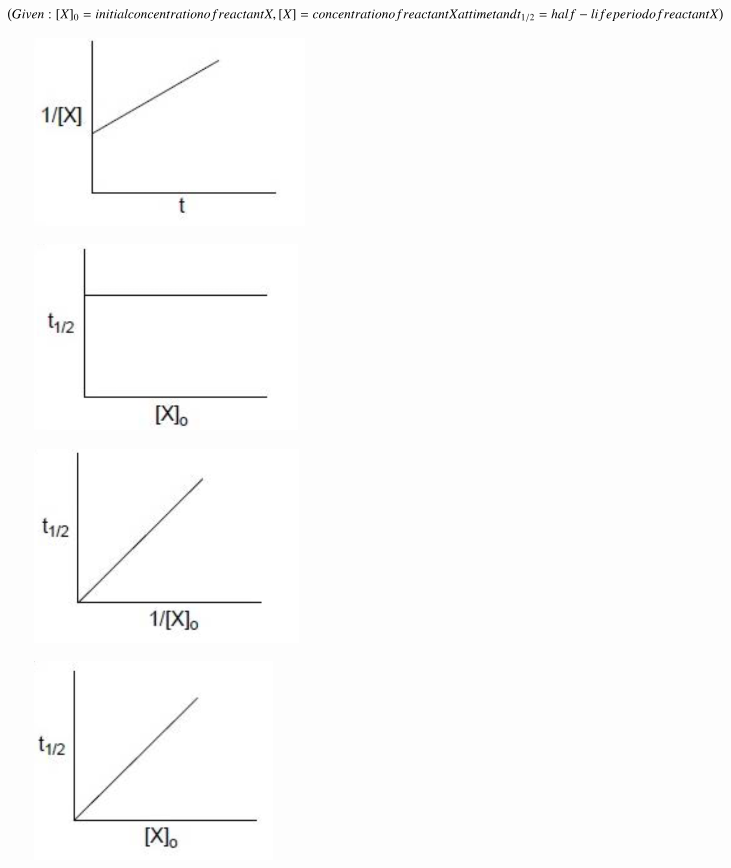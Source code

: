 \documentclass[journal,12pt,onecolumn]{IEEEtran}
\begin{document}
\begin{enumerate}
$\left(Given: [X]_0 =initial concentration of reactant X, [X] = concentration of reactant X at time t and t_{1/2} = half-life period of reactant X\right)$
    \begin{enumerate}
	\begin{figure}[h!]
		\centering
	    \item \includegraphics{15a}
		    \caption*{}
		\label{fig:Q15a}
	\end{figure}
	\begin{figure}[h!]
		\centering
	    \item \includegraphics{15b}
		    \caption*{}
		\label{fig:Q15b}
	\end{figure}
	\begin{figure}[h!]
		\centering
	    \item \includegraphics{15c}
		    \caption*{}
		\label{fig:Q15c}
	\end{figure}
	\begin{figure}[h!]
		\centering
	    \item \includegraphics{15d}

\end{figure}
\end{enumerate}
\end{enumerate}
\end{document}
